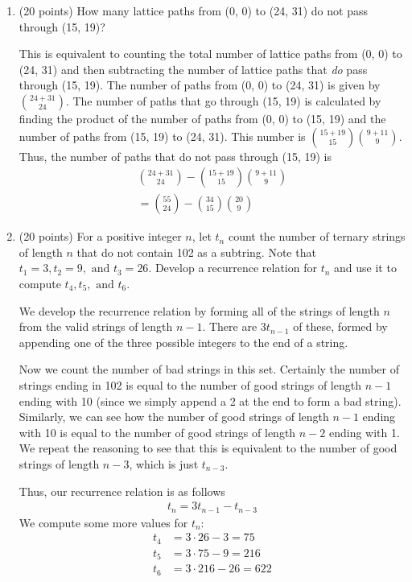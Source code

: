 \documentclass[12pt]{article}
\begin{document}
\begin{enumerate}
    \pagebreak

    \item (20 points) How many lattice paths from (0, 0) to (24, 31) do not pass through (15, 19)?

    This is equivalent to counting the total number of lattice paths from (0, 0) to (24, 31) and then subtracting the number of lattice paths that \textit{do} pass through (15, 19). The number of paths from (0, 0) to (24, 31) is given by \({24 + 31 \choose 24}\). The number of paths that go through (15, 19) is calculated by finding the product of the number of paths from (0, 0) to (15, 19) and the number of paths from (15, 19) to (24, 31). This number is \({15 + 19 \choose 15} {9 + 11 \choose 9}\).
    Thus, the number of paths that do not pass through (15, 19) is
    \begin{align*}
      {24 + 31 \choose 24} - {15 + 19 \choose 15} {9 + 11 \choose 9} \\ = \boxed{{55 \choose 24} - {34 \choose 15} {20 \choose 9}}
    \end{align*}

    \pagebreak

    \item (20 points) For a positive integer \(n\), let \(t_{n}\) count the number of ternary strings of length \(n\) that do not contain 102 as a subtring. Note that \(t_{1} = 3, t_{2} = 9, \text{ and } t_{3} = 26\). Develop a recurrence relation for \(t_{n}\) and use it to compute \(t_{4}, t_{5}, \text{ and } t_{6}\).

    We develop the recurrence relation by forming all of the strings of length \(n\) from the valid strings of length \(n-1\). There are \(3t_{n-1}\) of these, formed by appending one of the three possible integers to the end of a string.

    Now we count the number of bad strings in this set. Certainly the number of strings ending in 102 is equal to the number of good strings of length \(n-1\) ending with 10 (since we simply append a 2 at the end to form a bad string). Similarly, we can see how the number of good strings of length \(n-1\) ending with 10 is equal to the number of good strings of length \(n-2\) ending with 1. We repeat the reasoning to see that this is equivalent to the number of good strings of length \(n-3\), which is just \(t_{n-3}\).

    Thus, our recurrence relation is as follows
    \begin{align*}
      \boxed{t_{n} = 3t_{n-1} - t_{n-3}}
    \end{align*}
    We compute some more values for \(t_{n}\):
    \begin{align*}
      t_{4} &= 3 \cdot 26  - 3  = 75  \\
      t_{5} &= 3 \cdot 75  - 9  = 216 \\
      t_{6} &= 3 \cdot 216 - 26 = 622
    \end{align*}

  \end{enumerate}
\end{document}
